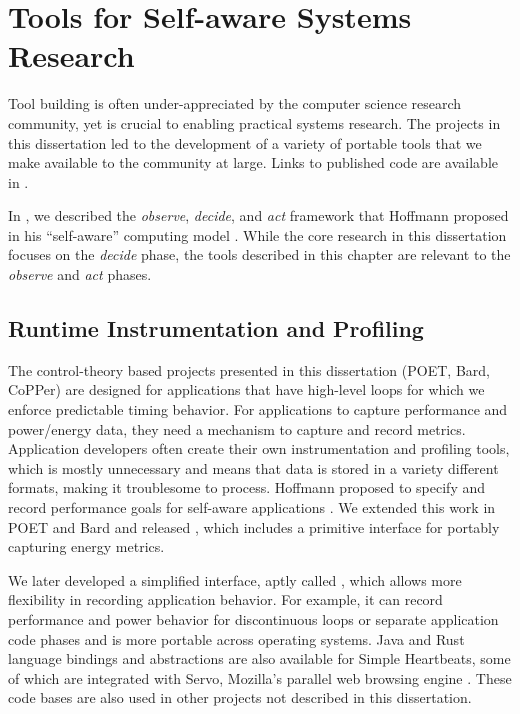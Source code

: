 \chapter{Tools for Self-aware Systems Research}
\label{app:tools}

Tool building is often under-appreciated by the computer science research community, yet is crucial to enabling practical systems research.
The projects in this dissertation led to the development of a variety of portable tools that we make available to the community at large.
Links to published code are available in .

In , we described the \emph{observe}, \emph{decide}, and \emph{act} framework that Hoffmann proposed in his ``self-aware'' computing model \cite{HoffmannPhD}.
While the core research in this dissertation focuses on the \emph{decide} phase, the tools described in this chapter are relevant to the \emph{observe} and \emph{act} phases.


\section{Runtime Instrumentation and Profiling}
\label{app:profiling}

The control-theory based projects presented in this dissertation (POET, Bard, CoPPer) are designed for applications that have high-level loops for which we enforce predictable timing behavior.
For applications to capture performance and power/energy data, they need a mechanism to capture and record metrics.
Application developers often create their own instrumentation and profiling tools, which is mostly unnecessary and means that data is stored in a variety different formats, making it troublesome to process.
Hoffmann \etal proposed  to specify and record performance goals for self-aware applications \cite{icac2010heartbeats}.
We extended this work in POET and Bard and released , which includes a primitive interface for portably capturing energy metrics.

We later developed a simplified interface, aptly called , which allows more flexibility in recording application behavior.
For example, it can record performance and power behavior for discontinuous loops or separate application code phases and is more portable across operating systems.
Java and Rust language bindings and abstractions are also available for Simple Heartbeats, some of which are integrated with Servo, Mozilla's parallel web browsing engine \cite{servo}.
These code bases are also used in other projects not described in this dissertation.

